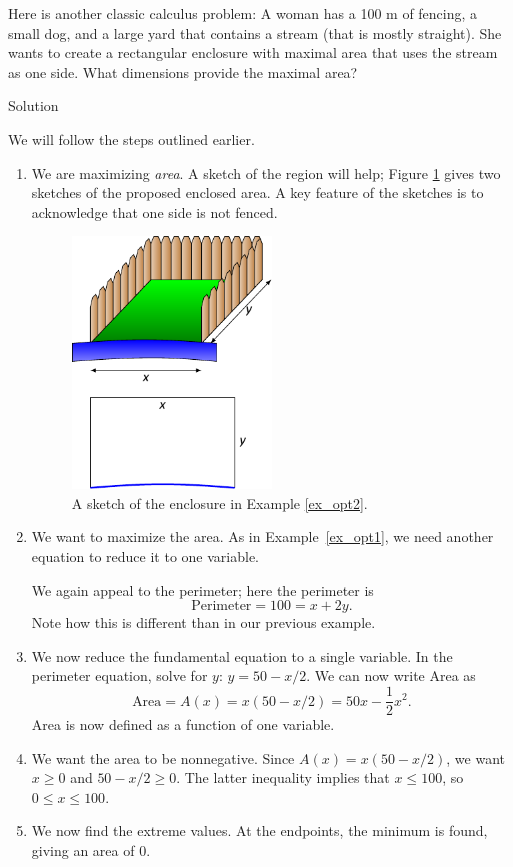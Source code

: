 \begin{example}
\label{ex_opt2}
Here is another classic calculus problem: A woman has a 100 m of fencing, a small dog, and a large yard that contains a stream (that is mostly straight). She wants to create a rectangular enclosure with maximal area that uses the stream as one side.  What dimensions provide the maximal area?

Solution 


We will follow the steps outlined earlier. 
	\begin{enumerate}
	\item		We are maximizing \textit{area}. A sketch of the region will help; Figure \ref{fig_behaviour_29} gives two sketches of the proposed enclosed area. A key feature of the sketches is to acknowledge that one side is not fenced. 

\begin{figure}[H]
	\begin{center}
			\includegraphics[width=0.5\textwidth]{fig_behaviour_29}
	\caption{A sketch of the enclosure in Example \ref{ex_opt2}.}
	\label{fig_behaviour_29}
	\end{center}
\end{figure}



	
	\item		We want to maximize the area. As in Example~\ref{ex_opt1}, we need another equation to  reduce it to one variable. 
	
	We again appeal to the perimeter; here the perimeter is $$\text{Perimeter} = 100 = x+2y.$$ Note how this is different than in our previous example.
	\item		We now reduce the fundamental equation to a single variable. In the perimeter equation, solve for $y$: $y = 50 - x/2$. We can now write Area as $$\text{Area} = A(x) = x(50-x/2) = 50x - \frac12x^2.$$ Area is now defined as a function of one variable.
	\item		We want the area to be nonnegative. Since $A(x) = x(50-x/2)$, we want $x\geq 0$ and $50-x/2\geq 0$. The latter inequality implies that $x\leq100$, so $0\leq x\leq 100$. 
	\item		We now find the extreme values. At the endpoints, the minimum is found, giving an area of 0. 
	

\end{enumerate}
\end{example}
